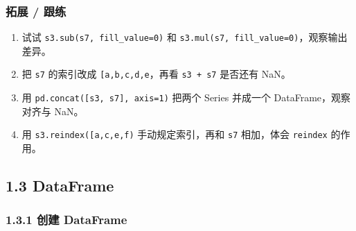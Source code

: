 \subsubsection{拓展 / 跟练}\label{ux62d3ux5c55-ux8ddfux7ec3-6}

\begin{enumerate}
\def\labelenumi{\arabic{enumi}.}
\tightlist
\item
  试试 \texttt{s3.sub(s7,\ fill\_value=0)} 和
  \texttt{s3.mul(s7,\ fill\_value=0)}，观察输出差异。
\item
  把 \texttt{s7} 的索引改成
  \texttt{{[}\textquotesingle{}a\textquotesingle{},\textquotesingle{}b\textquotesingle{},\textquotesingle{}c\textquotesingle{},\textquotesingle{}d\textquotesingle{},\textquotesingle{}e\textquotesingle{}{]}}，再看
  \texttt{s3\ +\ s7} 是否还有 NaN。
\item
  用 \texttt{pd.concat({[}s3,\ s7{]},\ axis=1)} 把两个 Series 并成一个
  DataFrame，观察对齐与 NaN。
\item
  用
  \texttt{s3.reindex({[}\textquotesingle{}a\textquotesingle{},\textquotesingle{}c\textquotesingle{},\textquotesingle{}e\textquotesingle{},\textquotesingle{}f\textquotesingle{}{]})}
  手动规定索引，再和 \texttt{s7} 相加，体会 \texttt{reindex} 的作用。
\end{enumerate}

\subsection{1.3 DataFrame}\label{dataframe}

\subsubsection{1.3.1 创建 DataFrame}\label{ux521bux5efa-dataframe}


